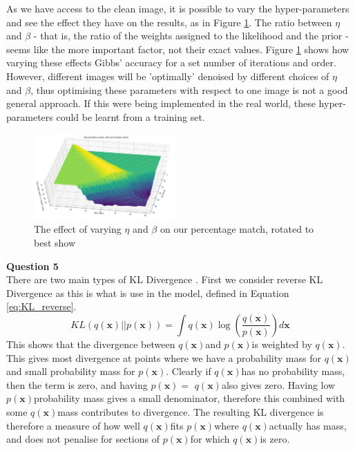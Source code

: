 \documentclass[10pt, a4paper, twocolumn]{article} %
\def \qx   {$q(\textbf{x})$}
\def \px   {$p(\textbf{x})$}
\begin{document}
As we have access to the clean image, it is possible to vary the hyper-parameters and see the effect they have on the results, as in Figure \ref{fig:EtaBetaVariation}. The ratio between $\eta$ and $\beta$ - that is, the ratio of the weights assigned to the likelihood and the prior - seems like the more important factor, not their exact values. Figure \ref{fig:EtaBetaVariation} shows how varying these effects Gibbs' accuracy for a set number of iterations and order. However, different images will be 'optimally' denoised by different choices of $\eta$ and $\beta$, thus optimising these parameters with respect to one image is not a good general approach. If this were being implemented in the real world, these hyper-parameters could be learnt from a training set.\\
\begin{figure}
    \centering
    \includegraphics[width=0.48\textwidth]{images/etaBetaResize.png}
    \caption{The effect of varying $\eta$ and $\beta$ on our percentage match, rotated to best show}
    \label{fig:EtaBetaVariation}
\end{figure}

\noindent\textbf{Question 5}\\
There are two main types of KL Divergence \cite{klDiv}.
First we consider reverse KL Divergence as this is what is use in the model, defined in Equation \ref{eq:KL_reverse}.
\begin{equation}
     KL(q(\mathbf{x})||p(\mathbf{x})) =  \int q(\mathbf{x}) \log\left(\frac{q(\mathbf{x})}{p(\mathbf{x})}\right)d\textbf{x}
     \label{eq:KL_reverse}
\end{equation}
This shows that the divergence between \qx and \px is weighted by \qx. This gives most divergence at points where we have a probability mass for \qx and small probability mass for \px. Clearly if \qx  has no probability mass, then the term is zero, and having \px $=$ \qx also gives zero. Having low \px probability mass gives a small denominator, therefore this combined with some \qx mass contributes to divergence. The resulting KL divergence is therefore a measure of how well \qx fits \px where \qx actually has mass, and does not penalise for sections of \px for which \qx is zero.  
\end{document}
